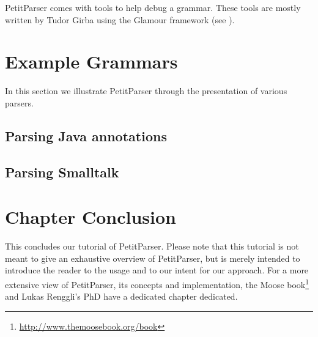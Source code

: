\documentclass[a4paper,10pt,twoside]{book}
\begin{document}
PetitParser comes with tools to help debug a grammar. These tools are
mostly written by Tudor Girba using the Glamour framework (see
).

\section{Example Grammars}

In this section we illustrate PetitParser through the presentation of
various parsers.

\subsection{Parsing Java annotations}


\subsection{Parsing Smalltalk}

\section{Chapter Conclusion}

This concludes our tutorial of PetitParser. Please note that this
tutorial is not meant to give an exhaustive overview of PetitParser,
but is merely intended to introduce the reader to the usage and to our
intent for our approach. For a more extensive view of PetitParser, its
concepts and implementation, the Moose
book\footnote{\url{http://www.themoosebook.org/book}} and Lukas
Renggli's PhD have a dedicated chapter dedicated.

\ifx\wholebook\relax\else
\label{cha:glamour}

\end{document}
